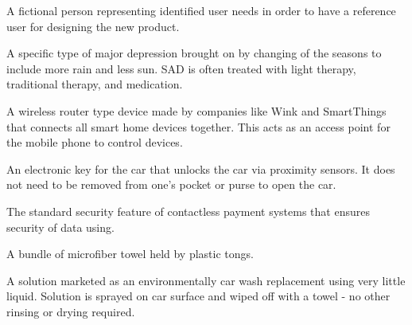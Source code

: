 \item[Persona] A fictional person representing identified user needs in order to have a reference user for designing the new product. 
\item [Seasonal Affective Disorder (SAD)] A specific type of major depression brought on by changing of the seasons to include more rain and less sun. SAD is often treated with light therapy, traditional therapy, and medication.
\item[Smart home hub] A wireless router type device made by companies like Wink and SmartThings that connects all smart home devices together. This acts as an access point for the mobile phone to control devices.
\item [Smart Key Fob] An electronic key for the car that unlocks the car via proximity sensors. It does not need to be removed from one's pocket or purse to open the car.
\item [Tokenization] The standard security feature of contactless payment systems that ensures security of data using.
\item [Towel Arm] A bundle of microfiber towel held by plastic tongs.
\item [Waterless Car Wash] A solution marketed as an environmentally car wash replacement using very little liquid. Solution is sprayed on car surface and wiped off with a towel - no other rinsing or drying required.